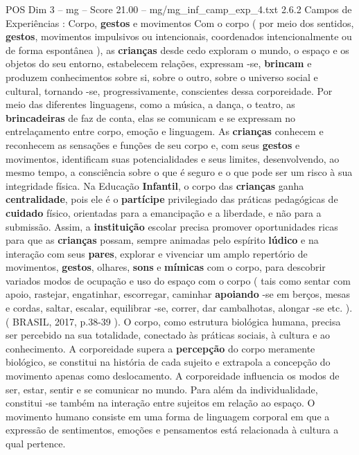 \begin{textsample}{POS Dim 3 – mg – Score 21.00 – mg/mg\_inf\_camp\_exp\_4.txt}  \label{ex:f3_pos_263}
2.6.2 Campos de Experiências : Corpo, \textbf{gestos} e movimentos Com o corpo ( por meio dos sentidos, \textbf{gestos}, movimentos impulsivos ou intencionais, coordenados intencionalmente ou de forma espontânea ), as \textbf{crianças} desde cedo exploram o mundo, o espaço e os objetos do seu entorno, estabelecem relações, expressam -se, \textbf{brincam} e produzem conhecimentos sobre si, sobre o outro, sobre o universo social e cultural, tornando -se, progressivamente, conscientes dessa corporeidade.
Por meio das diferentes linguagens, como a música, a dança, o teatro, as \textbf{brincadeiras} de faz de conta, elas se comunicam e se expressam no entrelaçamento entre corpo, emoção e linguagem.
As \textbf{crianças} conhecem e reconhecem as sensações e funções de seu corpo e, com seus \textbf{gestos} e movimentos, identificam suas potencialidades e seus limites, desenvolvendo, ao mesmo tempo, a consciência sobre o que é seguro e o que pode ser um risco à sua integridade física.
Na Educação \textbf{Infantil}, o corpo das \textbf{crianças} ganha \textbf{centralidade}, pois ele é o \textbf{partícipe} privilegiado das práticas pedagógicas de \textbf{cuidado} físico, orientadas para a emancipação e a liberdade, e não para a submissão.
Assim, a \textbf{instituição} escolar precisa promover oportunidades ricas para que as \textbf{crianças} possam, sempre animadas pelo espírito \textbf{lúdico} e na interação com seus \textbf{pares}, explorar e vivenciar um amplo repertório de movimentos, \textbf{gestos}, olhares, \textbf{sons} e \textbf{mímicas} com o corpo, para descobrir variados modos de ocupação e uso do espaço com o corpo ( tais como sentar com apoio, rastejar, engatinhar, escorregar, caminhar \textbf{apoiando} -se em berços, mesas e cordas, saltar, escalar, equilibrar -se, correr, dar cambalhotas, alongar -se etc. ). ( BRASIL, 2017, p.38-39 ).
O corpo, como estrutura biológica humana, precisa ser percebido na sua totalidade, conectado às práticas sociais, à cultura e ao conhecimento.
A corporeidade supera a \textbf{percepção} do corpo meramente biológico, se constitui na história de cada sujeito e extrapola a concepção do movimento apenas como deslocamento.
A corporeidade influencia os modos de ser, estar, sentir e se comunicar no mundo.
Para além da individualidade, constitui -se também na interação entre sujeitos em relação ao espaço.
O movimento humano consiste em uma forma de linguagem corporal em que a expressão de sentimentos, emoções e pensamentos está relacionada à cultura a qual pertence.

\end{textsample}
